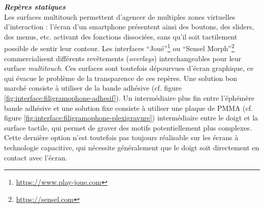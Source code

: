 \noindent\textbf{\textit{Repères statiques}}\\
\noindent Les surfaces multitouch permettent d'agencer de multiples zones virtuelles d'interaction : l'écran d'un smartphone présentent ainsi des boutons, des sliders, des menus, etc. activant des fonctions dissociées, sans qu'il soit tactilement possible de sentir leur contour. Les interfaces ``Joué''\footnote{\url{https://www.play-joue.com}} ou ``Sensel Morph''\footnote{\url{https://sensel.com}} commercialisent différents revêtements (\textit{overlays}) interchangeables pour leur surface \textit{multitouch}. Ces surfaces sont toutefois dépourvues d'écran graphique, ce qui évacue le problème de la transparence de ces repères. Une solution bon marché consiste à utiliser de la bande adhésive (cf. figure \ref{fig:interface:filigramophone-adhesif}). Un intermédiaire plus fin entre l'éphémère bande adhésive et une solution fixe consiste à utiliser une plaque de \gls{PMMA} (cf. figure \ref{fig:interface:filigramophone-plexigravure}) intermédiaire entre le doigt et la surface tactile, qui permet de graver des motifs potentiellement plus complexes. Cette dernière option n'est toutefois pas toujours réalisable sur les écrans à technologie capacitive, qui nécessite généralement que le doigt soit directement en contact avec l'écran.
